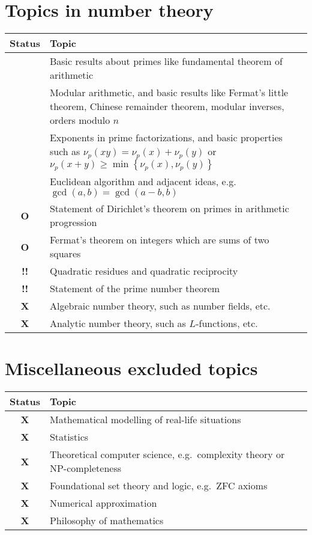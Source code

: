 \documentclass[11pt]{scrartcl}
\providecommand{\isRq}{{\color{green!60!black}\CheckmarkBold}}
\providecommand{\isUs}{{\color{cyan}\sffamily\bfseries O}}
\providecommand{\isAv}{{\color{gray}\sffamily\bfseries !!}}
\providecommand{\isEx}{{\color{red}\sffamily\bfseries X}}
\begin{document}
\section{Topics in number theory}
\begin{center}
	\begin{tabular}{cp{12cm}}
	\toprule Status & Topic \\ \midrule
	\isRq & Basic results about primes like fundamental theorem of arithmetic \\
	\isRq & Modular arithmetic, and basic results like Fermat's little theorem,
		Chinese remainder theorem, modular inverses, orders modulo $n$ \\
	\isRq & Exponents in prime factorizations,
		and basic properties such as $\nu_p(xy) = \nu_p(x) + \nu_p(y)$
		or $\nu_p(x+y) \ge \min \left\{ \nu_p(x), \nu_p(y) \right\}$ \\
	\isRq & Euclidean algorithm and adjacent ideas,
		e.g.\ $\gcd(a,b) = \gcd(a-b,b)$ \\
	\isUs & Statement of Dirichlet's theorem on primes in arithmetic progression \\
	\isUs & Fermat's theorem on integers which are sums of two squares \\
	\isAv & Quadratic residues and quadratic reciprocity \\
	\isAv & Statement of the prime number theorem \\
	\isEx & Algebraic number theory, such as number fields, etc. \\
	\isEx & Analytic number theory, such as $L$-functions, etc. \\
	\bottomrule
	\end{tabular}
\end{center}

\section{Miscellaneous excluded topics}
\begin{center}
	\begin{tabular}{cp{12cm}}
	\toprule Status & Topic \\ \midrule
	\isEx & Mathematical modelling of real-life situations \\
	\isEx & Statistics \\
	\isEx & Theoretical computer science, e.g.\ complexity theory or NP-completeness \\
	\isEx & Foundational set theory and logic, e.g.\ ZFC axioms \\
	\isEx & Numerical approximation \\
	\isEx & Philosophy of mathematics \\
	\bottomrule
	\end{tabular}
\end{center}
\end{document}
